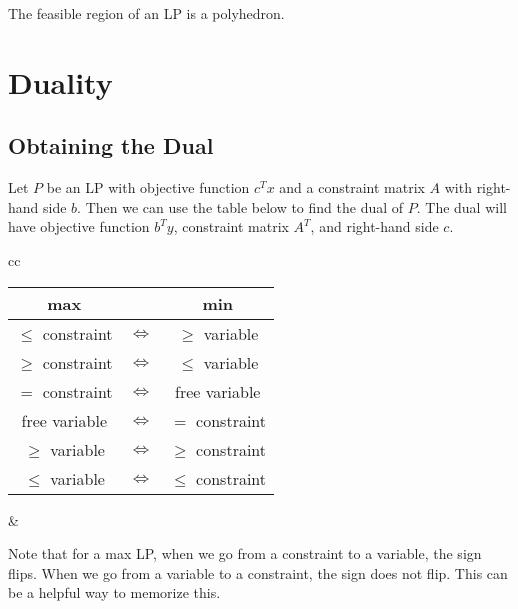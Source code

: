 \documentclass[a4paper]{report}
\begin{document}
\begin{remark}
  The feasible region of an LP is a polyhedron.
\end{remark}

\chapter{Duality}

\section{Obtaining the Dual}
\begin{definition}[Dual of an LP]\label{dual}
  Let $P$ be an LP with objective function $c^Tx$ and a constraint matrix $A$ with right-hand side $b$. Then we can use the table below to find the dual of $P$. The dual will have objective function $b^T y$, constraint matrix $A^T$, and right-hand side $c$.
\end{definition}

\begin{note}
  \begin{tabular}{cc}
    \begin{minipage}{.5\linewidth}
    \begin{tabular}{|c|c|c|}
    \hline
    \textbf{max} & & \textbf{min} \\
    \hline
    $\leq$ constraint & $\iff$ & $\geq$ variable \\
    \hline  
    $\geq$ constraint & $\iff$ & $\leq$ variable \\ 
    \hline
    $=$ constraint & $\iff$ & free variable \\
    \hline
    \hline
    free variable & $\iff$ & $=$ constraint \\
    \hline
    $\geq$ variable & $\iff$ & $\geq$ constraint \\
    \hline   
    $\leq$ variable & $\iff$ & $\leq$ constraint \\
    \hline
  \end{tabular}
\end{minipage} &
\begin{minipage}{.5\linewidth}
  Note that for a max LP, when we go from a constraint to a variable, the sign flips. When we go from a variable to a constraint, the sign does not flip. This can be a helpful way to memorize this.
\end{minipage}%
\end{tabular}
\end{note}
\end{document}
